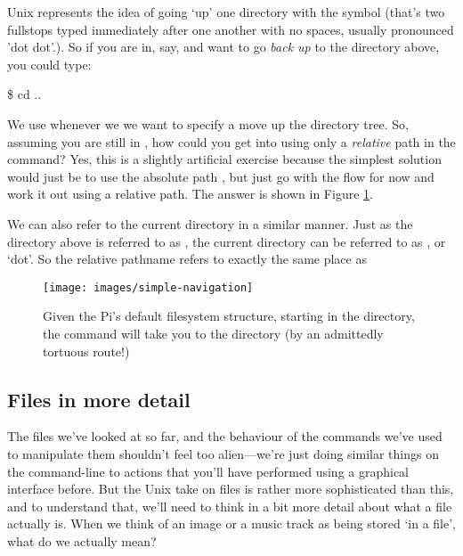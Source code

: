 Unix represents the idea of going `up' one directory with the  symbol (that's two fullstops typed immediately after one another with no spaces, usually pronounced 'dot dot'.). So if you are in, say,  and want to go \textit{back up} to the directory above, you could type:

\begin{ttoutenv}
\$ cd ..
\end{ttoutenv}

We use  whenever we we want to specify a move up the directory tree. So, assuming you are still in , how could you get into  using only a \textit{relative} path in the  command? Yes, this is a slightly artificial exercise because the simplest solution would just be to use the absolute path , but just go with the flow for now and work it out using a relative path. The answer is shown in Figure \ref{figure:simple-navigation}.

We can also refer to the current directory in a similar manner. Just as the directory above is referred to as , the current directory can be referred to as , or `dot'. So the relative pathname  refers to exactly the same place as 


\begin{figure}[t]
\centerline{\texttt{[image: images/simple-navigation]}}
\caption{Given the Pi's default filesystem structure, starting in the  directory, the command  will take you to the  directory (by an admittedly tortuous route!)}\label{figure:simple-navigation}
\end{figure}

\subsection{Files in more detail}

The files we've looked at so far, and the behaviour of the commands we've used to manipulate them shouldn't feel too alien---we're just doing similar things on the command-line to actions that you'll have performed using a graphical interface before. But the Unix take on files is rather more sophisticated than this, and to understand that, we'll need to think in a bit more detail about what a file actually is. When we think of an image or a music track as being stored `in a file', what do we actually mean?

